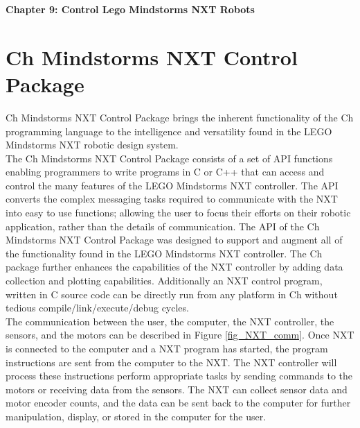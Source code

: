 \documentclass[12pt]{article}
\begin{document}
\baselineskip=12pt
\vspace*{-1.5cm}\textbf{}


\centerline{\bf\Large Chapter 9: Control Lego Mindstorms NXT Robots}
\addtocounter{section}{8}

\section{Ch Mindstorms NXT Control Package}
Ch Mindstorms NXT Control Package brings the inherent functionality of the Ch programming language
 to the intelligence and versatility found in the LEGO Mindstorms NXT robotic design system.
\\
\newline
The Ch Mindstorms NXT Control Package consists of a set of API functions enabling programmers to 
write programs in C or C++ that can access and control the many features of the LEGO Mindstorms 
NXT controller. The API converts the complex messaging tasks required to communicate with the NXT 
into easy to use functions; allowing the user  to focus their efforts on their robotic application, 
rather than the details of communication. The API of the Ch Mindstorms NXT Control Package was designed 
to support and augment all of the functionality found in the LEGO Mindstorms NXT controller. The Ch package 
further enhances the capabilities of the NXT controller by adding data collection and plotting capabilities. 
Additionally an NXT control program, written in C source code can be directly run from any platform in Ch 
without tedious compile/link/execute/debug cycles.
\\
\newline
The communication between the user, the computer, the NXT controller, the sensors, and the motors can be 
described in Figure \ref{fig_NXT_comm}. Once NXT is connected to the computer and a NXT program has started, 
the program instructions are sent from the computer to the NXT. The NXT controller will process these 
instructions perform appropriate tasks by sending commands to the motors or receiving data from the sensors. 
The NXT can collect sensor data and motor encoder counts, and the data can be sent back to the computer for 
further manipulation, display, or stored in the computer for the user. 
\newline
\\
\end{document}
